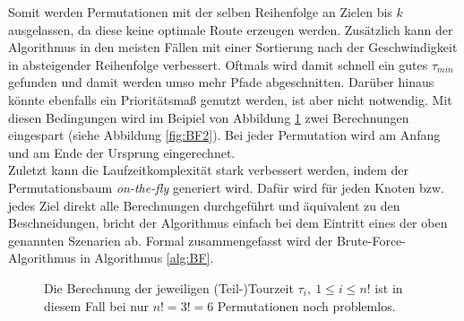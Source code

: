 \documentclass[german,version-2019-11]{uzl-thesis}
\begin{document}
Somit werden Permutationen mit der selben Reihenfolge an Zielen bis $k$ ausgelassen, da diese keine optimale Route erzeugen werden. Zusätzlich kann der Algorithmus in den meisten Fällen mit einer Sortierung nach der Geschwindigkeit in absteigender Reihenfolge verbessert. Oftmals wird damit schnell ein gutes $\tau_{min}$ gefunden und damit werden umso mehr Pfade abgeschnitten. Darüber hinaus könnte ebenfalls ein Prioritätsmaß genutzt werden, ist aber nicht notwendig.
Mit diesen Bedingungen wird im Beipiel von Abbildung \ref{fig:BF1} zwei Berechnungen eingespart (siehe Abbildung \ref{fig:BF2}). Bei jeder Permutation wird am Anfang und am Ende der Ursprung eingerechnet. \\
Zuletzt kann die Laufzeitkomplexität stark verbessert werden, indem der Permutationsbaum \emph{on-the-fly} generiert wird. Dafür wird für jeden Knoten bzw. jedes Ziel direkt alle Berechnungen durchgeführt und äquivalent zu den Beschneidungen, bricht der Algorithmus einfach bei dem Eintritt eines der oben genannten Szenarien ab. Formal zusammengefasst wird der Brute-Force-Algorithmus in Algorithmus \ref{alg:BF}. \\

\begin{figure}[htbp]
\centering
{}
\caption{Die Berechnung der jeweiligen (Teil-)Tourzeit $\tau_{i}, ~1\leq i\leq n!$ ist in diesem Fall bei nur $n!=3!=6$ Permutationen noch problemlos.}
\label{fig:BF1}
\end{figure}
\end{document}
